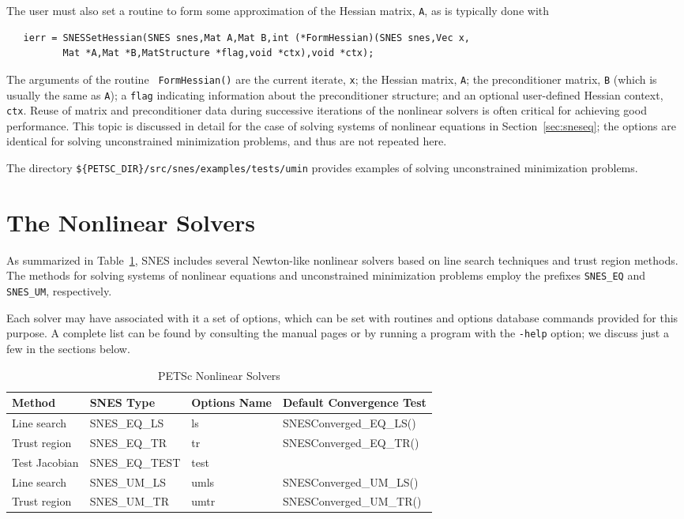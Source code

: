 The user must also set a routine to form some approximation of the Hessian
matrix, {\tt A}, as is typically done with
\begin{verbatim}
   ierr = SNESSetHessian(SNES snes,Mat A,Mat B,int (*FormHessian)(SNES snes,Vec x,
          Mat *A,Mat *B,MatStructure *flag,void *ctx),void *ctx);
\end{verbatim}
The  arguments of the routine {\tt
FormHessian()} are the current iterate, {\tt x}; the Hessian matrix,
{\tt A}; the preconditioner matrix, {\tt B} (which is usually the same
as {\tt A}); a {\tt flag} indicating information about the
preconditioner structure; and an optional user-defined Hessian
context, {\tt ctx}.  Reuse of matrix and preconditioner data during
successive iterations of the nonlinear solvers is often critical for
achieving good performance.  This topic is discussed in detail for the
case of solving systems of nonlinear equations in
Section~\ref{sec:sneseq}; the options are identical for solving
unconstrained minimization problems, and thus are not repeated here.

The directory {\tt \$\{PETSC\_DIR\}/src/snes/examples/tests/umin} provides
examples of solving unconstrained minimization problems. 

\section{The Nonlinear Solvers}
\label{sec:nlsolvers}

As summarized in Table~\ref{tab:snesdefaults}, SNES includes several
Newton-like nonlinear solvers based on line search techniques and
trust region methods.  The methods for solving systems of nonlinear
equations and unconstrained minimization problems employ the prefixes
{\tt SNES\_EQ} and {\tt SNES\_UM}, respectively.  

Each solver may have associated with it a set of options, which can be
set with routines and options database commands provided for this
purpose.  A complete list can be found by consulting the manual pages
or by running a program with the {\tt -help} option; we discuss just a
few in the sections below.

\begin{table}
\begin{center}
\begin{tabular}{llll}
{\bf Method}    &{\bf SNES Type}& {\bf Options Name}    &{\bf Default Convergence Test}\\
\hline
Line search     & SNES\_EQ\_LS   & ls   & SNESConverged\_EQ\_LS()\\
Trust region    & SNES\_EQ\_TR   & tr   & SNESConverged\_EQ\_TR()\\
Test Jacobian   & SNES\_EQ\_TEST        & test  & \\
\hline
Line search     & SNES\_UM\_LS   & umls & SNESConverged\_UM\_LS()\\
Trust region    & SNES\_UM\_TR   & umtr & SNESConverged\_UM\_TR()\\
\hline
\end{tabular}
\end{center}
\label{tab:snesdefaults}
\caption{PETSc Nonlinear Solvers}
\end{table}

